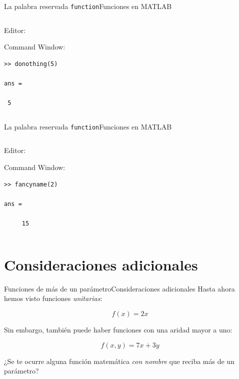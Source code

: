 \documentclass[spanish, c]{beamer}
\newcommand{\matlab}[1]{\lstinline[style=Matlab-editor]!#1!}
\begin{document}
\begin{frame}[fragile]{La palabra reservada \matlab{function}}{Funciones en MATLAB}
    \begin{columns}
        \begin{column}{0.95\linewidth}
            Editor:
            \bigskip
            

            \bigskip
            
            Command Window:
            \bigskip
\begin{lstlisting}[style=output]
>> donothing(5)

ans =

 5
\end{lstlisting}
        \end{column}
    \end{columns}
\end{frame}

               
\begin{frame}[fragile]{La palabra reservada \matlab{function}}{Funciones en MATLAB}
    \begin{columns}
        \begin{column}{0.95\linewidth}
            Editor:
            \bigskip
            

            \bigskip
            
            Command Window:
            \bigskip
\begin{lstlisting}[style=output]
>> fancyname(2)

ans =

     15
\end{lstlisting} 
        \end{column}
        
    \end{columns}
\end{frame}

\section{Consideraciones adicionales}

\begin{frame}{Funciones de más de un parámetro}{Consideraciones adicionales}
    Hasta ahora hemos visto funciones \textit{unitarias}:

    $$f(x) = 2x$$ \pause

    Sin embargo, también puede haber funciones con una \alert{aridad} mayor a uno:

    $$f(x, y) = 7x + 3y$$ \pause

    ¿Se te ocurre alguna función matemática \textit{con nombre} que reciba más de un parámetro?

\end{frame}
\end{document}
